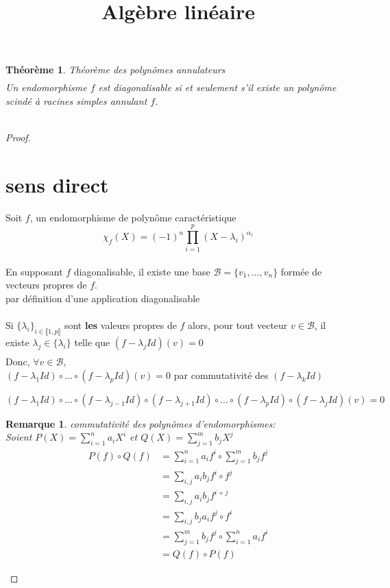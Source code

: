 \documentclass{article}
\date{}
\author{}
\title{Algèbre linéaire}
\newtheorem{rema}{Remarque}
\newtheorem*{theo}{Théorème}
\newcommand\BBB{\mathcal{B}}
\begin{document}
\begin{theo}{Théorème des polynômes annulateurs}
$$\phantom{a}$$
Un endomorphisme $f$ est diagonalisable si et seulement s'il existe un polynôme scindé à racines simples annulant $f$.\\
\end{theo}

$$\phantom{a}$$

\begin{proof}
$\phantom{a}$
	\section{sens direct}
	Soit $f$, un endomorphisme de polynôme caractéristique 
	$$\chi_f(X) = (-1)^n \prod\limits_{i=1}^p (X - \lambda_i)^{\alpha_i}$$

$\phantom{a}$\\[5mm]

	En supposant $f$ diagonalisable, il existe une base $\BBB = \{v_1, ..., v_n\}$ formée de vecteurs propres de $f$.\\
	{\tiny par définition d'une application diagonalisable}

$\phantom{a}$\\[1cm]


	Si $\{\lambda_i\}_{i \in \llbracket 1, p \rrbracket}$ sont \textbf{les} valeurs propres de $f$ alors, pour tout vecteur $v \in \BBB$, il existe $\lambda_j \in \{\lambda_i\}$ telle que $(f - \lambda_j Id) (v) = 0$\\

$\phantom{a}$\\[1cm]

\newpage
	Donc, $\forall v \in \BBB$, \\
	$(f-\lambda_1 Id) \circ ... \circ (f-\lambda_p Id)(v) = 0$ par commutativité des $(f - \lambda_k Id)$\\ 
	{\tiny
	$(f-\lambda_1 Id) \circ ... \circ (f-\lambda_{j-1} Id) \circ (f-\lambda_{j+1} Id) \circ ... \circ (f-\lambda_p Id) \circ (f-\lambda_j Id)(v) = 0$
\begin{rema}	
	commutativité des polynômes d'endomorphismes:\\
	Soient $P(X) = \sum\limits_{i=1}^n a_iX^i$ et $Q(X) = \sum\limits_{j=1}^m b_jX^j$
	$$
\begin{aligned}
	P(f) \circ Q(f) &= \sum_{i=1}^n a_if^i \circ \sum_{j=1}^m b_jf^j\\
	&= \sum_{i,j} a_ib_jf^i \circ f^j\\
	&= \sum_{i,j} a_ib_jf^{i+j}\\
	&= \sum_{i,j} b_ja_if^j \circ f^i\\
	&= \sum_{j=1}^m b_jf^j \circ \sum_{i=1}^n a_if^i\\
	&= Q(f) \circ P(f)
\end{aligned}
	$$
\end{rema}}


\end{proof}
\end{document}

